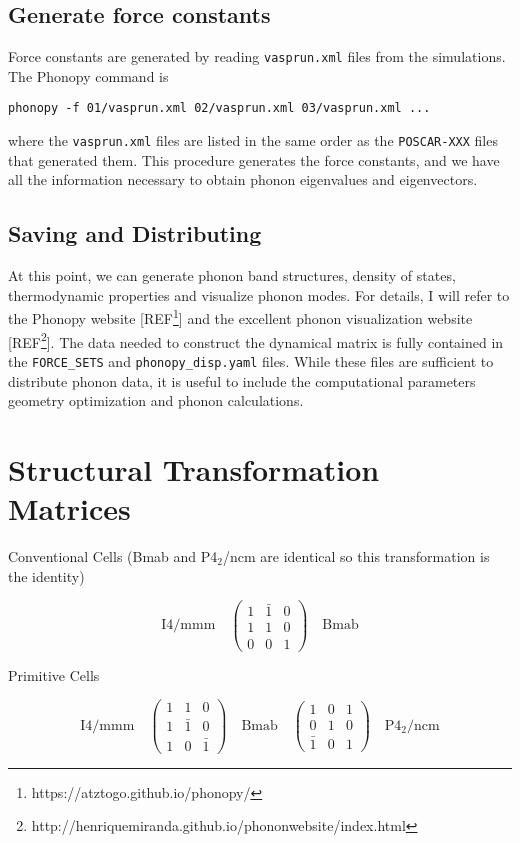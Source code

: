 \section{Generate force constants}
Force constants are generated by reading \texttt{vasprun.xml} files from the simulations. The Phonopy command is
\begin{lstlisting}
phonopy -f 01/vasprun.xml 02/vasprun.xml 03/vasprun.xml ...
\end{lstlisting}

\noindent where the \texttt{vasprun.xml} files are listed in the same order as the \texttt{POSCAR-XXX} files that generated them. This procedure generates the force constants, and we have all the information necessary to obtain phonon eigenvalues and eigenvectors.

\section{Saving and Distributing}
At this point, we can generate phonon band structures, density of states, thermodynamic properties and visualize phonon modes. For details, I will refer to the Phonopy website [REF\footnote{https://atztogo.github.io/phonopy/}] and the excellent phonon visualization website [REF\footnote{http://henriquemiranda.github.io/phononwebsite/index.html}]. The data needed to construct the dynamical matrix is fully contained in the \texttt{FORCE\_SETS} and \texttt{phonopy\_disp.yaml} files. While these files are sufficient to distribute phonon data, it is useful to include the computational parameters geometry optimization and phonon calculations.

\chapter{Structural Transformation Matrices}

Conventional Cells (Bmab and P4$_2$/ncm are identical so this transformation is the identity)

\[
\text{I4/mmm} \quad 
\begin{pmatrix}
1 & \bar{1} & 0 \\
1 & 1 & 0 \\
0 & 0 & 1
\end{pmatrix}
\quad \text{Bmab}
\]

\noindent Primitive Cells

\[
\text{I4/mmm} \quad 
\begin{pmatrix}
1 & 1 & 0 \\
1 & \bar{1} & 0 \\
1 & 0 & \bar{1}
\end{pmatrix}
\quad \text{Bmab} \quad
\begin{pmatrix}
1 & 0 & 1 \\
0 & 1 & 0 \\
\bar{1} & 0 & 1
\end{pmatrix} 
\quad \text{P4}_2\text{/ncm}
\]
